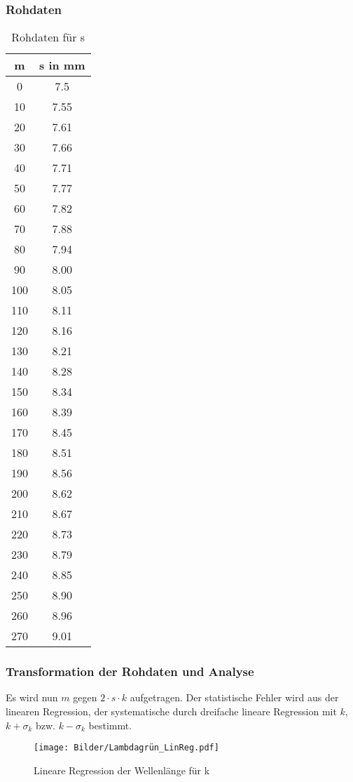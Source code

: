 \documentclass[12pt,a4paper]{article}
\begin{document}
\subsubsection{Rohdaten}
\begin{table}[H]\centering
\begin{tabular}{c||c}
m&s in mm\\
\hline
0&7.5\\
10&7.55\\
20&7.61\\
30&7.66\\
40&7.71\\
50&7.77\\
60&7.82\\
70&7.88\\
80&7.94\\
90&8.00\\
100&8.05\\
110&8.11\\
120&8.16\\
130&8.21\\
140&8.28\\
150&8.34\\
160&8.39\\
170&8.45\\
180&8.51\\
190&8.56\\
200&8.62\\
210&8.67\\
220&8.73\\
230&8.79\\
240&8.85\\
250&8.90\\
260&8.96\\
270&9.01\\

\end{tabular}
\caption{Rohdaten für s}\label{Tabelle}
\end{table}
\subsubsection{Transformation der Rohdaten und Analyse}
Es wird nun $m$ gegen $2\cdot s \cdot k$ aufgetragen. Der statistische Fehler wird aus der linearen Regression, der systematische durch dreifache lineare Regression mit $k$, $k+\sigma_k$ bzw. $k-\sigma_k$ bestimmt.
\begin{figure}[H]
\centering
\texttt{[image: Bilder/Lambdagrün\_LinReg.pdf]}
\caption{Lineare Regression der Wellenlänge für k}
\end{figure}
\end{document}

